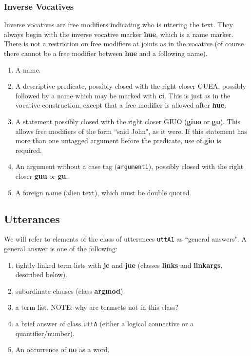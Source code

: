 \documentclass[12pt]{book}
\begin{document}
\subsubsection{Inverse Vocatives}

Inverse vocatives are free modifiers indicating who is uttering the text.  They always begin with the inverse vocative marker {\bf hue}, which is a name marker.  There is not a restriction on free modifiers at joints as in the vocative (of course there cannot be a free modifier between {\bf hue} and a following name).

\begin{enumerate}


\item  A name.

\item  A descriptive predicate, possibly closed with the right closer GUEA, possibly followed by a name which may be marked with {\bf ci}.  This is just as in the vocative construction, except that a free modifier is allowed after {\bf hue}.

\item  A statement possibly closed with the right closer GIUO ({\bf giuo} or {\bf gu}).  This allows free modifiers of the form ``said John", as it were.  If this statement has more than one
untagged argument before the predicate, use of {\bf gio} is required.

\item An argument without a case tag ({\tt argument1}), possibly closed with the right closer {\bf guu} or {\bf gu}.

\item  A foreign name (alien text), which must be double quoted.

\end{enumerate}

\subsection{Utterances}

We will refer to elements of the class of utterances {\tt uttA1} as ``general answers".   A general answer is one of the following:

\begin{enumerate}



\item  tightly linked term lists with {\bf je} and {\bf jue} (classes {\bf links} and {\bf linkargs}, described below).

\item  subordinate clauses (class {\bf argmod}).

\item a term list.  NOTE:  why are termsets not in this class?

\item a brief answer of class {\tt uttA} (either a logical connective or a quantifier/number).

\item An occurrence of {\bf no} as a word.

\end{enumerate}
\end{document}
